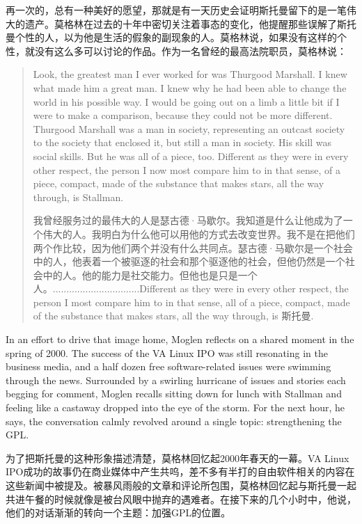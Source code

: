 \ifdefined\chs
再一次的，总有一种美好的愿望，那就是有一天历史会证明斯托曼留下的是一笔伟大的遗产。莫格林在过去的十年中密切关注着事态的变化，他提醒那些误解了斯托曼个性的人，以为他是生活的假象的副现象的人。莫格林说，如果没有这样的个性，就没有这么多可以讨论的作品。作为一名曾经的最高法院职员，莫格林说：
\fi

\begin{quote}
\ifdefined\eng
Look, the greatest man I ever worked for was Thurgood Marshall. I knew what made him a great man. I knew why he had been able to change the world in his possible way. I would be going out on a limb a little bit if I were to make a comparison, because they could not be more different. Thurgood Marshall was a man in society, representing an outcast society to the society that enclosed it, but still a man in society. His skill was social skills. But he was all of a piece, too. Different as they were in every other respect, the person I now most compare him to in that sense, of a piece, compact, made of the substance that makes stars, all the way through, is Stallman.
\fi

\ifdefined\chs
我曾经服务过的最伟大的人是瑟古德·马歇尔。我知道是什么让他成为了一个伟大的人。我明白为什么他可以用他的方式去改变世界。我不是在把他们两个作比较，因为他们两个并没有什么共同点。瑟古德·马歇尔是一个社会中的人，他表着一个被驱逐的社会和那个驱逐他的社会，但他仍然是一个社会中的人。他的能力是社交能力。但他也是只是一个人。................................Different as they were in every other respect, the person I most compare him to in that sense, all of a piece, compact, made of the substance that makes stars, all the way through, is 斯托曼.
\fi
\end{quote}

\ifdefined\eng
In an effort to drive that image home, Moglen reflects on a shared moment in the spring of 2000. The success of the VA Linux IPO was still resonating in the business media, and a half dozen free software-related issues were swimming through the news. Surrounded by a swirling hurricane of issues and stories each begging for comment, Moglen recalls sitting down for lunch with Stallman and feeling like a castaway dropped into the eye of the storm. For the next hour, he says, the conversation calmly revolved around a single topic: strengthening the GPL.
\fi

\ifdefined\chs
为了把斯托曼的这种形象描述清楚，莫格林回忆起2000年春天的一幕。VA Linux IPO成功的故事仍在商业媒体中产生共呜，差不多有半打的自由软件相关的内容在这些新闻中被提及。被暴风雨般的文章和评论所包围，莫格林回忆起与斯托曼一起共进午餐的时候就像是被台风眼中抛弃的遇难者。在接下来的几个小时中，他说，他们的对话渐渐的转向一个主题：加强GPL的位置。
\fi

